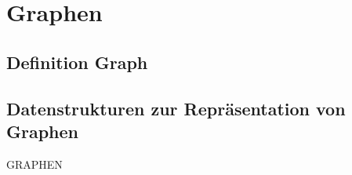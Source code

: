 \chapter{Graphen}

\section{Definition Graph}

\section{Datenstrukturen zur Repräsentation von Graphen}
GRAPHEN